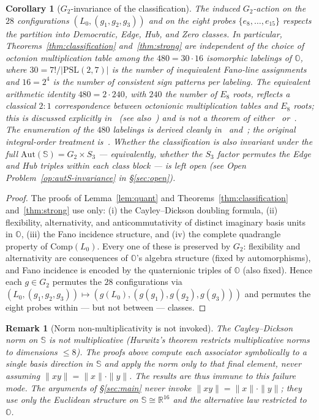 \documentclass[12pt,a4paper]{article}
\newtheorem{remark}[theorem]{Remark}
\newtheorem{corollary}[theorem]{Corollary}
\begin{document}
\begin{corollary}[$G_2$-invariance of the classification]
The induced $G_2$-action on the $28$ configurations $(L_0, (g_1, g_2, g_3))$ and on the eight probes $\{e_8, \ldots, e_{15}\}$ respects the partition into Democratic, Edge, Hub, and Zero classes. In particular, Theorems~\ref{thm:classification} and~\ref{thm:strong} are independent of the choice of octonion multiplication table among the $480 = 30 \cdot 16$ isomorphic labelings of $\mathbb{O}$, where $30 = 7!/|\mathrm{PSL}(2,7)|$ is the number of inequivalent Fano-line assignments and $16 = 2^4$ is the number of consistent sign patterns per labeling. The equivalent arithmetic identity $480 = 2 \cdot 240$, with $240$ the number of $E_8$ roots, reflects a classical $2 : 1$ correspondence between octonionic multiplication tables and $E_8$ roots; this is discussed explicitly in~\cite[Ch.~8, \S10.3]{ConwaySmith2003} (see also~\cite[\S4.3]{wilson2009}) and is not a theorem of either~\cite[\S2.3]{Baez2002} or~\cite[Ch.~8 and \S10.3]{ConwaySmith2003}. The enumeration of the $480$ labelings is derived cleanly in~\cite[\S2.3]{Baez2002} and~\cite[Ch.~8 and \S10.3]{ConwaySmith2003}; the original integral-order treatment is~\cite{coxeter1946}. Whether the classification is also invariant under the full $\mathrm{Aut}(\mathbb{S}) = G_2 \times S_3$ --- equivalently, whether the $S_3$ factor permutes the Edge and Hub triples within each class block --- is left open (see Open Problem~\ref{op:autS-invariance} in \S\ref{sec:open}).
\end{corollary}

\begin{proof}
The proofs of Lemma~\ref{lem:quant} and Theorems~\ref{thm:classification} and~\ref{thm:strong} use only: (i) the Cayley--Dickson doubling formula, (ii) flexibility, alternativity, and anticommutativity of distinct imaginary basis units in $\mathbb{O}$, (iii) the Fano incidence structure, and (iv) the complete quadrangle property of $\mathrm{Comp}(L_0)$. Every one of these is preserved by $G_2$: flexibility and alternativity are consequences of $\mathbb{O}$'s algebra structure (fixed by automorphisms), and Fano incidence is encoded by the quaternionic triples of $\mathbb{O}$ (also fixed). Hence each $g \in G_2$ permutes the $28$ configurations via $(L_0, (g_1, g_2, g_3)) \mapsto (g(L_0), (g(g_1), g(g_2), g(g_3)))$ and permutes the eight probes within --- but not between --- classes.
\end{proof}

\begin{remark}[Norm non-multiplicativity is not invoked]
\label{rem:norm-nonmult}
The Cayley--Dickson norm on $\mathbb{S}$ is not multiplicative (Hurwitz's theorem restricts multiplicative norms to dimensions $\le 8$). The proofs above compute each associator symbolically to a single basis direction in $\mathbb{S}$ and apply the norm only to that final element, never assuming $\|xy\| = \|x\|\cdot\|y\|$. The results are thus immune to this failure mode.
The arguments of \S\ref{sec:main} never invoke $\|xy\| = \|x\| \cdot \|y\|$; they use only the Euclidean structure on $\mathbb{S} \cong \mathbb{R}^{16}$ and the alternative law restricted to $\mathbb{O}$.
\end{remark}
\end{document}
